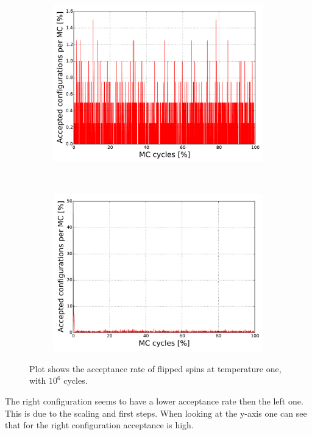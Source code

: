\begin{figure}[H]
    \centering
    \begin{subfigure}{0.5\textwidth}
        \centering
        \includegraphics[width=\linewidth]{result/bilder/config/energy22-MC1000000T1-configN20}
        \caption{}
    \end{subfigure}%
    ~ 
    \begin{subfigure}{0.5\textwidth}
        \centering
        \includegraphics[width=\linewidth]{result/bilder/config/energy22-MC1000000T1-config-RNGN20}
        \caption{}
    \end{subfigure}
    \caption{Plot shows the acceptance rate of flipped spins at temperature one, with $10^6$ cycles. }
    \label{fig:config-T1}
\end{figure}
The right configuration seems to have a lower acceptance rate then the left one. This is due to the scaling and first steps. When looking at the y-axis one can see that for the right configuration acceptance is high. 

